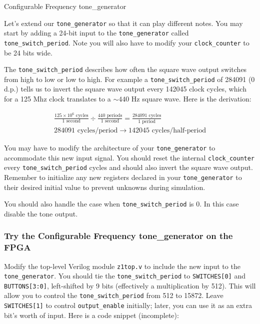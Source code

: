 \documentclass[11pt]{article}
\makeatletter
\renewcommand{\subsection}
{\@startsection {subsection}{1}{0pt}
 {-1ex}
 {0.5ex}
 {\bfseries\normalsize}}
\makeatother
\begin{document}
\subsection{Configurable Frequency tone\_generator}

Let's extend our \verb|tone_generator| so that it can play different notes. You may start by adding a 24-bit input to the \verb|tone_generator| called \verb|tone_switch_period|. Note you will also have to modify your \verb|clock_counter| to be 24 bits wide.

The \verb|tone_switch_period| describes how often the square wave output switches from high to low or low to high. For example a \verb|tone_switch_period| of 284091 (0 d.p.) tells us to invert the square wave output every 142045 clock cycles, which for a 125 Mhz clock translates to a $\sim 440$ Hz square wave. Here is the derivation:

\begin{eqnarray}
  \frac{125 \times 10^6 \text{ cycles}}{1 \text{ second}} \div \frac{440 \text{ periods}}{1 \text{ second}} = \frac{ 284091 \text{ cycles}}{1 \text{ period}} \nonumber \\
  284091 \text{ cycles/period} \rightarrow 142045 \text{ cycles/half-period} \nonumber
\end{eqnarray}

You may have to modify the architecture of your \verb|tone_generator| to accommodate this new input signal. You should reset the internal \verb|clock_counter| every \verb|tone_switch_period| cycles and should also invert the square wave output. Remember to initialize any new registers declared in your \verb|tone_generator| to their desired initial value to prevent unknowns during simulation.

You should also handle the case when \verb|tone_switch_period| is 0.  In this case disable the tone output.

\subsubsection{Try the Configurable Frequency tone\_generator on the FPGA}
Modify the top-level Verilog module \verb|z1top.v| to include the new input to the \verb|tone_generator|. You should tie the \verb|tone_switch_period| to \verb|SWITCHES[0]| and \verb|BUTTONS[3:0]|, left-shifted by 9 bits (effectively a multiplication by 512). This will allow you to control the \verb|tone_switch_period| from 512 to 15872. Leave \verb|SWITCHES[1]| to control \verb|output_enable| initially; later, you can use it as an extra bit's worth of input. Here is a code snippet (incomplete):
\end{document}
